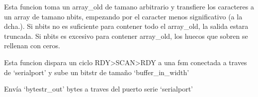 \documentclass[letterpaper,10pt,english]{sphinxmanual}
\begin{document}

\begin{fulllineitems}
\label{\detokenize{myfpga:myfpga.interfaz_pcps.resize_array}}
\pysigstartsignatures
{}
\pysigstopsignatures
\sphinxAtStartPar
Esta funcion toma un array\_old de tamano arbitrario y transfiere
los caracteres a un array de tamano nbits, empezando por el
caracter menos significativo (a la dcha.). Si nbits no es
suficiente para contener todo el array\_old, la salida estara
truncada. Si nbits es excesivo para contener array\_old,
los huecos que sobren se rellenan con ceros.

\end{fulllineitems}


\begin{fulllineitems}
\label{\detokenize{myfpga:myfpga.interfaz_pcps.scan}}
\pysigstartsignatures
{}
\pysigstopsignatures
\sphinxAtStartPar
Esta funcion dispara un ciclo RDY\sphinxhyphen{}\textgreater{}SCAN\sphinxhyphen{}\textgreater{}RDY
a una fsm conectada a traves de ‘serialport’
y sube un bitstr de tamaño ‘buffer\_in\_width’

\end{fulllineitems}


\begin{fulllineitems}
\label{\detokenize{myfpga:myfpga.interfaz_pcps.send_bytestr}}
\pysigstartsignatures
{}
\pysigstopsignatures
\sphinxAtStartPar
Envía ‘bytestr\_out’ bytes a traves del puerto serie ‘serialport’

\end{fulllineitems}
\end{document}
